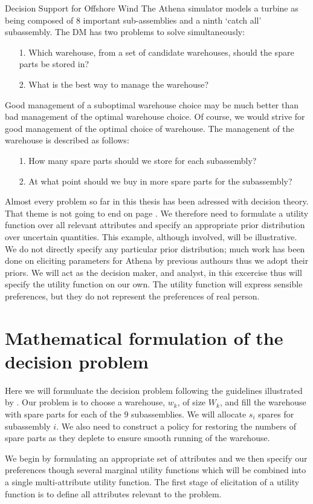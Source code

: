 \begin{chapter}{Decision Support for Offshore Wind \label{Ch:ds-for-ow}}
The Athena simulator models a turbine as being composed of $8$ important sub-assemblies and a ninth `catch all' subassembly. The DM has two problems to solve simultaneously:
\begin{itemize}
  \item[1.] Which warehouse, from a set of candidate warehouses, should the spare parts be stored in?
  \item[2.] What is the best way to manage the warehouse?
\end{itemize}
Good management of a suboptimal warehouse choice may be much better than bad management of the optimal warehouse choice. Of course, we would strive for good management of the optimal choice of warehouse. The managenent of the warehouse is described as follows:
\begin{itemize}
  \item[1.] How many spare parts should we store for each subassembly?
  \item[2.] At what point should we buy in more spare parts for the subassembly?
\end{itemize}
Almost every problem so far in this thesis has been adressed with decision theory. That theme is not going to end on page \thepage. We therefore need to formulate a utility function over all relevant attributes and specify an appropriate prior distribution over uncertain quantities. This example, although involved, will be illustrative. We do not directly specify any particular prior distribution; much work has been done on eliciting parameters for Athena by previous authours thus we adopt their priors. We will act as the decision maker, and analyst, in this excercise thus will specify the utility function on our own. The utility function will express sensible preferences, but they do not represent the preferences of real person.
\section{Mathematical formulation of the decision problem}
Here we will formuluate the decision problem following the guidelines illustrated by \citet{Smith2010}. Our problem is to choose a warehouse, $w_k$, of size $W_k$, and fill the warehouse with spare parts for each of the $9$ subassemblies.  We will allocate $s_i$ spares for subassembly $i$. We also need to construct a policy for restoring the numbers of spare parts as they deplete to ensure smooth running of the warehouse.

 We begin by formulating an appropriate set of attributes and we then specify our preferences though several marginal utility functions which will be combined into a single multi-attribute utility function. The first stage of elicitation of a utility function is to define all attributes relevant to the problem.


\end{chapter}

